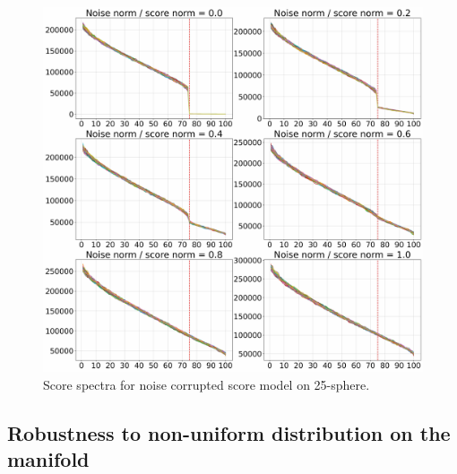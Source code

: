    \begin{figure}[h!]
       \centering
       \includegraphics[width=\textwidth]{Chapter3/figures/robustness_score.jpg}
       \caption{Score spectra for noise corrupted score model on 25-sphere.}
       \label{ch3:fig:robustness_score}
   \end{figure}

   \subsection{Robustness to non-uniform distribution on the manifold}

